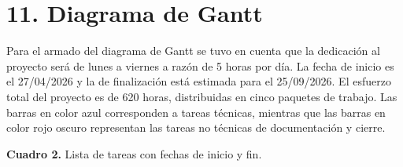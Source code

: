 \documentclass[
11pt, %
]{charter}
\begin{document}
\section{11. Diagrama de Gantt}
\label{sec:gantt}

Para el armado del diagrama de Gantt se tuvo en cuenta que la dedicaci\'{o}n al proyecto
ser\'{a} de lunes a viernes a raz\'{o}n de 5 horas por d\'{i}a. La fecha de inicio es el
27/04/2026 y la de finalizaci\'{o}n est\'{a} estimada para el 25/09/2026.
El esfuerzo total del proyecto es de 620 horas, distribuidas en cinco paquetes de trabajo.
Las barras en color azul corresponden a tareas t\'{e}cnicas, mientras que las barras
en color rojo oscuro representan las tareas no t\'{e}cnicas de documentaci\'{o}n y cierre.

\begin{center}
{\small \textbf{Cuadro 2.} Lista de tareas con fechas de inicio y fin.}


\end{center}
\end{document}
